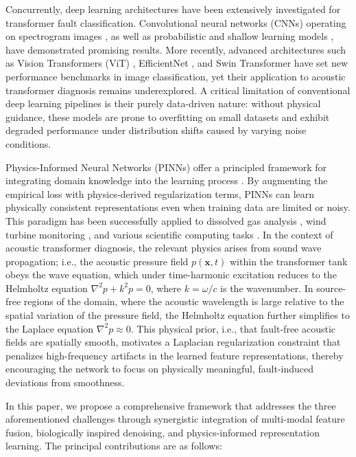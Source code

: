 \documentclass[twocolumn,iicol,pdflatex,sn-mathphys-num]{sn-jnl}%
\begin{document}
Concurrently, deep learning architectures have been extensively investigated for transformer fault classification. Convolutional neural networks (CNNs) operating on spectrogram images \cite{11014495}, as well as probabilistic and shallow learning models \cite{5352306,4717246}, have demonstrated promising results. More recently, advanced architectures such as Vision Transformers (ViT) \cite{dosovitskiy2021vit}, EfficientNet \cite{tan2019efficientnet}, and Swin Transformer \cite{liu2021swin} have set new performance benchmarks in image classification, yet their application to acoustic transformer diagnosis remains underexplored. A critical limitation of conventional deep learning pipelines is their purely data-driven nature: without physical guidance, these models are prone to overfitting on small datasets and exhibit degraded performance under distribution shifts caused by varying noise conditions.

Physics-Informed Neural Networks (PINNs) offer a principled framework for integrating domain knowledge into the learning process \cite{9903391,r4}. By augmenting the empirical loss with physics-derived regularization terms, PINNs can learn physically consistent representations even when training data are limited or noisy. This paradigm has been successfully applied to dissolved gas analysis \cite{10964340}, wind turbine monitoring \cite{11027711}, and various scientific computing tasks \cite{10551894}. In the context of acoustic transformer diagnosis, the relevant physics arises from sound wave propagation; i.e., the acoustic pressure field $p(\mathbf{x}, t)$ within the transformer tank obeys the wave equation, which under time-harmonic excitation reduces to the Helmholtz equation $\nabla^2 p + k^2 p = 0$, where $k = \omega/c$ is the wavenumber. In source-free regions of the domain, where the acoustic wavelength is large relative to the spatial variation of the pressure field, the Helmholtz equation further simplifies to the Laplace equation $\nabla^2 p \approx 0$. This physical prior, i.e., that fault-free acoustic fields are spatially smooth, motivates a Laplacian regularization constraint that penalizes high-frequency artifacts in the learned feature representations, thereby encouraging the network to focus on physically meaningful, fault-induced deviations from smoothness.

In this paper, we propose a comprehensive framework that addresses the three aforementioned challenges through synergistic integration of multi-modal feature fusion, biologically inspired denoising, and physics-informed representation learning. The principal contributions are as follows:
\end{document}
